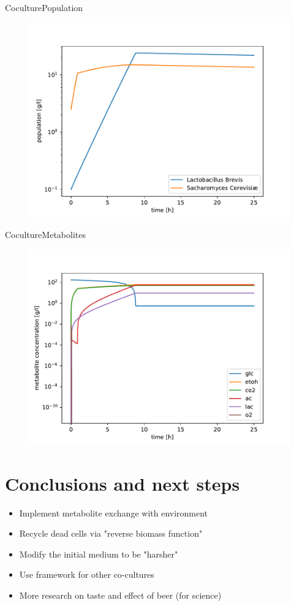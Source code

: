 \documentclass{beamer}
\begin{document}
\begin{frame}{Coculture}{Population}
	\begin{figure}
		\includegraphics[width=0.9\linewidth]{Img/Results/cocultures/cocult2_populations.pdf}
	\end{figure}
\end{frame}

\begin{frame}{Coculture}{Metabolites}
	\begin{figure}
		\includegraphics[width=0.9\linewidth]{Img/Results/cocultures/cocult2_metabolites.pdf}
	\end{figure}
\end{frame}

\section{Conclusions and next steps}
\begin{frame}
	\begin{itemize}
		\item Implement metabolite exchange with environment
		\item Recycle dead cells via "reverse biomass function"
		\item Modify the initial medium to be "harsher"
		\item Use framework for other co-cultures
		\item More research on taste and effect of beer (for science)
	\end{itemize}
\end{frame}
\end{document}
